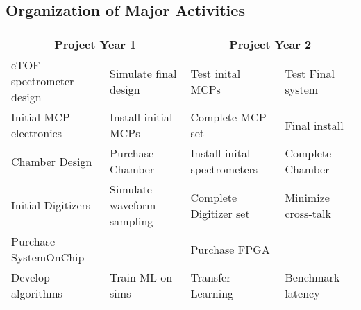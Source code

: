 \subsection*{Organization of Major Activities}
\small
\begin{tabular}{l|l|l|l}
\hline
\multicolumn{2}{c|}{Project Year 1} &  \multicolumn{2}{c}{Project Year 2} \\
\hline
eTOF spectrometer design & Simulate final design & Test inital MCPs & Test Final system\\
Initial MCP electronics & Install initial MCPs & Complete MCP set & Final install\\
Chamber Design & Purchase Chamber& Install inital spectrometers & Complete Chamber\\
Initial Digitizers & Simulate waveform sampling& Complete Digitizer set & Minimize cross-talk\\
\hline
Purchase SystemOnChip & & Purchase FPGA &\\
Develop algorithms& Train ML on sims & Transfer Learning & Benchmark latency\\
\hline
\end{tabular}
\normalsize


